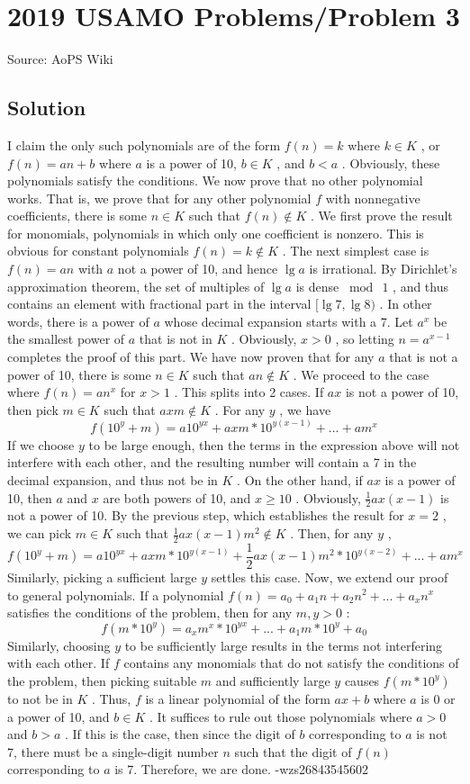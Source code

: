 \documentclass[12pt]{article}
\begin{document}
\section*{{2019 USAMO Problems/Problem 3}}
Source: AoPS Wiki

\subsection*{Solution}
I claim the only such polynomials are of the form $f(n)=k$ where $k\in K$ , or $f(n)=an+b$ where $a$ is a power of 10, $b\in K$ , and $b<a$ . Obviously, these polynomials satisfy the conditions. We now prove that no other polynomial works. That is, we prove that for any other polynomial $f$ with nonnegative coefficients, there is some $n\in K$ such that $f(n)\notin K$ . We first prove the result for monomials, polynomials in which only one coefficient is nonzero. This is obvious for constant polynomials $f(n)=k\notin K$ . The next simplest case is $f(n)=an$ with $a$ not a power of 10, and hence $\lg a$ is irrational. By Dirichlet's approximation theorem, the set of multiples of $\lg a$ is dense $\bmod\ 1$ , and thus contains an element with fractional part in the interval $[\lg 7,\lg 8)$ . In other words, there is a power of $a$ whose decimal expansion starts with a 7. Let $a^x$ be the smallest power of $a$ that is not in $K$ . Obviously, $x>0$ , so letting $n=a^{x-1}$ completes the proof of this part. We have now proven that for any $a$ that is not a power of 10, there is some $n\in K$ such that $an\notin K$ . We proceed to the case where $f(n)=an^x$ for $x>1$ . This splits into 2 cases. If $ax$ is not a power of 10, then pick $m\in K$ such that $axm\notin K$ . For any $y$ , we have \[f(10^y+m)=a10^{yx}+axm*10^{y(x-1)}+...+am^x\] If we choose $y$ to be large enough, then the terms in the expression above will not interfere with each other, and the resulting number will contain a 7 in the decimal expansion, and thus not be in $K$ . On the other hand, if $ax$ is a power of 10, then $a$ and $x$ are both powers of 10, and $x\ge10$ . Obviously, $\frac12ax(x-1)$ is not a power of 10. By the previous step, which establishes the result for $x=2$ , we can pick $m\in K$ such that $\frac12ax(x-1)m^2\notin K$ . Then, for any $y$ , \[f(10^y+m)=a10^{yx}+axm*10^{y(x-1)}+\frac12ax(x-1)m^2*10^{y(x-2)}+...+am^x\] Similarly, picking a sufficient large $y$ settles this case. Now, we extend our proof to general polynomials. If a polynomial $f(n)=a_0+a_1n+a_2n^2+...+a_xn^x$ satisfies the conditions of the problem, then for any $m,y>0$ : \[f(m*10^y)=a_xm^x*10^{yx}+...+a_1m*10^y+a_0\] Similarly, choosing $y$ to be sufficiently large results in the terms not interfering with each other. If $f$ contains any monomials that do not satisfy the conditions of the problem, then picking suitable $m$ and sufficiently large $y$ causes $f(m*10^y)$ to not be in $K$ . Thus, $f$ is a linear polynomial of the form $ax+b$ where $a$ is 0 or a power of 10, and $b\in K$ . It suffices to rule out those polynomials where $a>0$ and $b>a$ . If this is the case, then since the digit of $b$ corresponding to $a$ is not 7, there must be a single-digit number $n$ such that the digit of $f(n)$ corresponding to $a$ is 7. Therefore, we are done. -wzs26843545602
\end{document}
